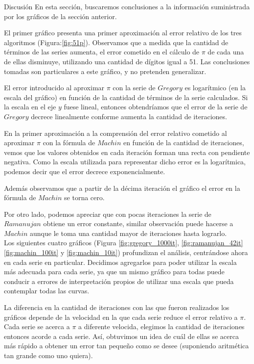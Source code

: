 \begin{section}{Discusión}
	En esta sección, buscaremos conclusiones a la información suministrada por los gráficos de la sección anterior.
	
	El primer gráfico presenta una primer aproximación al error relativo de los tres algoritmos (Figura:\ref{fig:51p}).
	Observamos que a medida que la cantidad de términos de las series aumenta, el error cometido en el cálculo de $\pi$ de cada una de ellas disminuye, utilizando una cantidad de dígitos igual a 51. Las conclusiones tomadas son particulares a este gráfico, y no pretenden generalizar.
	
	El error introducido al aproximar $\pi$ con la serie de $Gregory$ es logarítmico (en la escala del gráfico) en función de la cantidad de términos de la serie calculados. Si la escala en el eje $y$ fuese lineal, entonces obtendríamos que el error de la serie de $Gregory$ decrece linealmente conforme aumenta la cantidad de iteraciones.
	
	En la primer aproximación a la comprensión del error relativo cometido al aproximar $\pi$ con la fórmula de $Machin$ en función de la cantidad de iteraciones, vemos que los valores obtenidos en cada iteración forman una recta con pendiente negativa. Como la escala utilizada para representar dicho error es la logarítmica, podemos decir que el error decrece exponencialmente.
	
	Además observamos que a partir de la décima iteración el gráfico el error en la fórmula de $Machin$ se torna cero.
	
	Por otro lado, podemos apreciar que con pocas iteraciones la serie de $Ramanujan$ obtiene un error constante, similar observación puede hacerse a $Machin$ aunque le toma una cantidad mayor de iteraciones hasta lograrlo.\\
	
	Los siguientes cuatro gráficos (Figura \ref{fig:gregory_1000it}, \ref{fig:ramanujan_42it} \ref{fig:machin_100it} y \ref{fig:machin_10it}) profundizan el análisis, centrándose ahora en cada serie en particular. Decidimos agregarlos para poder utilizar la escala más adecuada para cada serie, ya que un mismo gráfico para todas puede conducir a errores de interpretación propios de utilizar una escala que pueda contemplar todas las curvas.
	
	La diferencia en la cantidad de iteraciones con las que fueron realizados los gráficos depende de la velocidad en la que cada serie reduce el error relativo a $\pi$. Cada serie se acerca a $\pi$ a diferente velocida, elegimos la cantidad de iteraciones entonces acorde a cada serie. Así, obtuvimos un idea de cuál de ellas se acerca más rápido a obtener un error tan pequeño como se desee (suponiendo aritmética tan grande como uno quiera).
	

\end{section}

